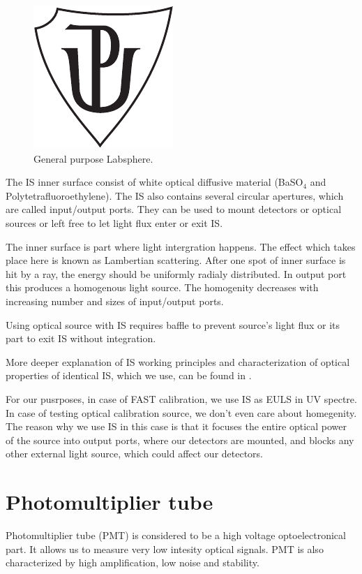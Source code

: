 \begin{figure}[H]
 \includegraphics{up_logo_bw}
 \caption{General purpose Labsphere.}
 \label{Labsphere}
 
\end{figure}
\par
The IS inner surface consist of white optical diffusive material (BaSO$_4$ and Polytetrafluoroethylene). The IS also contains several circular apertures, which are called input/output ports. They can be used to mount detectors or optical sources or left free to let light flux enter or exit IS. 
\par
The inner surface is part where light intergration happens. The effect which takes place here is known as Lambertian scattering. After one spot of inner surface is hit by a ray, the energy should be uniformly radialy distributed. In output port this produces a homogenous light source. The homogenity decreases with increasing number and sizes of input/output ports.
\par
Using optical source with IS requires baffle to prevent source's light flux or its part to exit IS without integration.
\par
More deeper explanation of IS working principles and characterization of optical properties of identical IS, which we use, can be found in \cite{VACULA2021167169}.
\par
For our pusrposes, in case of FAST calibration, we use IS as EULS in UV spectre. In case of testing optical calibration source, we don't even care about homegenity. The reason why we use IS in this case is that it focuses the entire optical power of the source into output ports, where  our detectors are mounted, and blocks any other external light source, which could affect our detectors.

\section{Photomultiplier tube}
Photomultiplier tube (PMT) is considered to be a high voltage optoelectronical part. It allows us to measure very low intesity optical signals. PMT is also characterized by high amplification, low noise and stability. 
